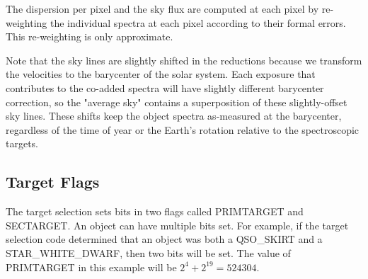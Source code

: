 \documentclass[12pt,preprint]{aastex}
\begin{document}
The dispersion per pixel and the sky flux are computed at each pixel
by re-weighting the individual spectra at each pixel according to
their formal errors. This re-weighting is only approximate.

Note that the sky lines are slightly shifted in the reductions
because we transform the velocities to the barycenter of the solar
system. Each exposure that contributes to the co-added spectra will
have slightly different barycenter correction, so the "average sky"
contains a superposition of these slightly-offset sky lines. These
shifts keep the object spectra as-measured at the barycenter,
regardless of the time of year or the Earth's rotation relative to
the spectroscopic targets.

\subsection{Target Flags}

The target selection sets bits in two flags called PRIMTARGET and
SECTARGET. An object can have multiple bits set. For example, if
the target selection code determined that an object was both a
QSO\_SKIRT and a STAR\_WHITE\_DWARF, then two bits will be set. The
value of PRIMTARGET in this example will be $2^4 + 2^{19} = 524304$.
\end{document}
